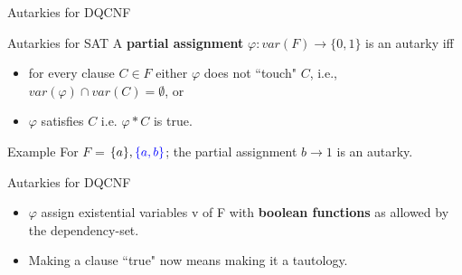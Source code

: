 \documentclass[xcolor=table	]{beamer}
\begin{document}
\begin{frame}{Autarkies for DQCNF}
\begin{block}{Autarkies for SAT}
	A \textbf{partial assignment} $\varphi: var(F) \to \{0,1\}$ is an autarky iff 
	\begin{itemize}
		\item for every clause $C \in F$ either $\varphi$ does not ``touch" $C$, i.e., $var(\varphi) \cap var(C) = \emptyset$, or
		\item  $\varphi$ satisfies $C$ i.e. $\varphi \ast C$ is true. 
	\end{itemize}
\pause 
\end{block}
\begin{exampleblock}{Example}
	For $F$ = $\{a\}, \textcolor{blue}{\{a, b\}}$; \pause the partial assignment $b \to 1$ is an autarky. 
\end{exampleblock}


\pause 

 \begin{alertblock}{Autarkies for DQCNF}
	\begin{itemize}
	 \item $\varphi$
	assign existential variables v of F with \textbf{boolean functions} as allowed by the dependency-set.
	
	\item Making a clause ``true" now means making it a tautology.
	
	\end{itemize}
	
\end{alertblock}
%	


\end{frame}
\end{document}
